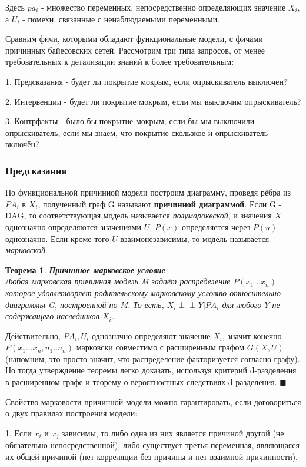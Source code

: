 \documentclass[fleqn]{article}
\newcommand{\independent}{\perp \!\!\! \perp}
\newtheorem{theorem}{Теорема}
\begin{document}
Здесь $pa_i$ - множество переменных, непосредственно определяющих значение $X_i$, а $U_i$ - помехи, связанные с ненаблюдаемыми переменными.

Сравним фичи, которыми обладают функциональные модели, с фичами причинных байесовских сетей. Рассмотрим три типа запросов, от менее требовательных к детализации знаний  к более требовательным:

1. Предсказания  - будет ли покрытие мокрым, если опрыскиватель выключен?

2. Интервенции - будет ли покрытие мокрым, если мы выключим опрыскиватель?

3. Контрфакты - было бы покрытие мокрым, если бы мы выключили опрыскиватель, если мы знаем, что покрытие скользкое и опрыскиватель включён?

\subsubsection*{Предсказания}

По функциональной причинной модели построим диаграмму, проведя рёбра из $PA_i$ в $X_i$, полученный граф G называют \textbf{причинной диаграммой}.  Если G - DAG, то соответствующая модель называется \textit{полумароквской}, и значения $X$ однозначно определяются значениями $U$, $P(x)$ определяется через $P(u)$ однозначно. Если кроме того $U$ взаимонезависимы, то модель называется \textit{марковской}.

\begin{theorem}
	\textbf{Причинное марковское условие}\\
	Любая марковская причинная модель M задаёт распределение $P(x_1...x_n)$ которое удовлетворяет родительскому марковскому условию относительно диаграммы G, построенной по M. То есть, $X_i \independent Y | PA_i$ для любого $Y$ не содержащего наследников $X_i$.
\end{theorem}

Действительно, $PA_i,U_i$ однозначно определяют значение $X_i$, значит конечно $P(x_1...x_n, u_1..u_n)$ марковски совместимо с расширенным графом $G(X,U)$ (напомним, это просто значит, что распределение факторизуется согласно графу). Но тогда утверждение теоремы легко доказать, используя критерий d-разделения в расширенном графе и теорему о вероятностных следствиях d-разделения.
$\blacksquare$

Свойство марковости причинной модели можно гарантировать, если договориться о двух правилах построения модели:

1. Если $x_i$ и $x_j$ зависимы, то либо одна из них является причиной другой (не обязательно непосредственной), либо существует третья переменная, являющаяся их общей причиной (нет корреляции без причины и нет взаимной причинности).
\end{document}
